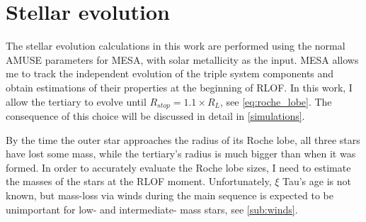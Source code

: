 \section{Stellar evolution}\label{sec:stellar_evolution}

The stellar evolution calculations in this work are performed using the normal AMUSE parameters for MESA, with solar metallicity as the input.
MESA allows me to track the independent evolution of the triple system components and obtain estimations of their properties at the beginning of RLOF. In this work, I allow the tertiary to evolve until $R_{stop} = 1.1 \times R_{L}$, see \cref{eq:roche_lobe}. The consequence of this choice will be discussed in detail in \cref{simulations}.

By the time the outer star approaches the radius of its Roche lobe, all three stars have lost some mass, while the tertiary's radius is much bigger than when it was formed. In order to accurately evaluate the Roche lobe sizes,  I need to estimate the masses of the stars at the RLOF moment. Unfortunately, $\xi$ Tau's age is not known, but mass-loss via winds during the main sequence is expected to be unimportant for low- and intermediate- mass stars, see \cref{sub:winds}.

